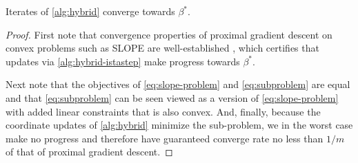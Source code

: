\begin{theorem}
  Iterates of \cref{alg:hybrid} converge towards \(\beta^*\).
\end{theorem}
\begin{proof}
  First note that convergence properties of proximal gradient descent on convex
  problems such as SLOPE are well-established
  \parencite{beck2009,daubechies2004}, which certifies that updates via
  \cref{alg:hybrid-istastep} make progress towards \(\beta^*\).

  Next note that the objectives of \eqref{eq:slope-problem} and
  \eqref{eq:subproblem} are equal and that \eqref{eq:subproblem} can be seen
  viewed as a version of \eqref{eq:slope-problem} with added linear constraints
  that is also convex. And, finally, because the coordinate updates of
  \cref{alg:hybrid} minimize the sub-problem, we in the worst case make no
  progress and therefore have guaranteed converge rate no less than \(1/m\)
  of that of proximal gradient descent.
\end{proof}

